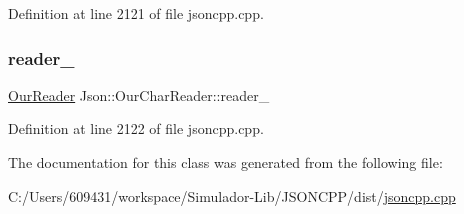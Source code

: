 Definition at line 2121 of file jsoncpp.\+cpp.

\hypertarget{class_json_1_1_our_char_reader_aedd4520b8570654ed7aa0726075ee58d}{}\label{class_json_1_1_our_char_reader_aedd4520b8570654ed7aa0726075ee58d} 
\subsubsection{\texorpdfstring{reader\+\_\+}{reader\_}}
{\footnotesize\ttfamily \hyperlink{class_json_1_1_our_reader}{Our\+Reader} Json\+::\+Our\+Char\+Reader\+::reader\+\_\+\hspace{0.3cm}{\ttfamily [private]}}



Definition at line 2122 of file jsoncpp.\+cpp.



The documentation for this class was generated from the following file\+:\begin{DoxyCompactItemize}
\item 
C\+:/\+Users/609431/workspace/\+Simulador-\/\+Lib/\+J\+S\+O\+N\+C\+P\+P/dist/\hyperlink{jsoncpp_8cpp}{jsoncpp.\+cpp}\end{DoxyCompactItemize}
